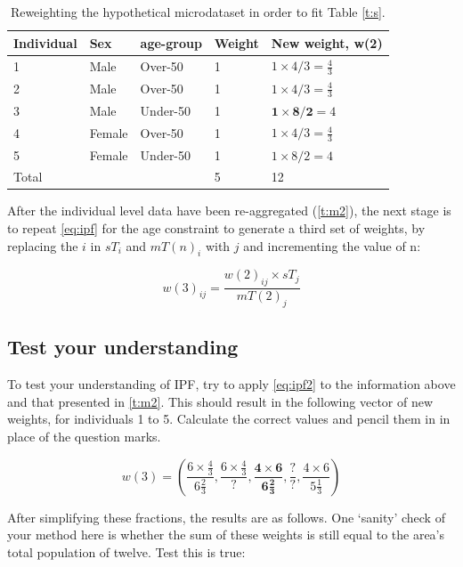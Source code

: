 \documentclass[a4paper, 11pt, twoside]{article}
\begin{document}
\begin{table}[htbp]
\centering
\caption{Reweighting the hypothetical microdataset in order to fit
Table \ref{t:s}.}
\begin{tabular}{lllll}
\toprule
{Individual} & {Sex} & {age-group} & {Weight} &
{New weight, w(2)} \\ \midrule
1 & Male & Over-50 & 1 & $1 \times 4/3 = \frac{4}{3}$ \\
2 & Male & Over-50 & 1 & $1 \times 4/3 = \frac{4}{3}$ \\
3 & Male & Under-50 & 1 & $\textbf{1} \times
\textbf{8}/\textbf{2} = 4$ \\
4 & Female & Over-50 & 1 & $1 \times 4/3 = \frac{4}{3}$ \\
5 & Female & Under-50 & 1 & $1 \times 8/2 = 4$ \\
\midrule
Total & & & 5 & 12 \\
\bottomrule
\end{tabular}
\label{t:new-weights}
\end{table}

After the individual level data have been re-aggregated (\cref{t:m2}),
the next stage is to repeat \cref{eq:ipf} for the age constraint to generate a
third set of weights, by replacing
the $i$ in $sT_{i}$ and $mT(n)_{i}$ with $j$ and incrementing the value of n:

\begin{equation}
w(3)_{ij} = \frac{w(2)_{ij} \times sT_{j}}{mT(2)_{j}}
\label{eq:ipf2}
\end{equation}

\subsection{Test your understanding}
To test your understanding of IPF, try to apply \cref{eq:ipf2} to the
information above
and that presented in \cref{t:m2}.
This should result in the following vector of new weights, for individuals 1 to
5. Calculate the correct values and pencil them in in place of the question
marks.  %


\begin{equation}
w(3) = (\frac{6 \times \frac{4}{3}}{6 \frac{2}{3}}, \frac{6 \times
\frac{4}{3}}{?}, \boldsymbol{ \frac{4 \times 6}{ 6\frac{2}{3}
}}, \frac{?}{?}, \frac{4 \times 6}{5 \frac{1}{3}})
\end{equation}

After simplifying these fractions, the results are as follows.
One `sanity' check of your method here is whether the sum of these
weights is still equal to the area's total population of twelve. Test this is
true:
\end{document}
